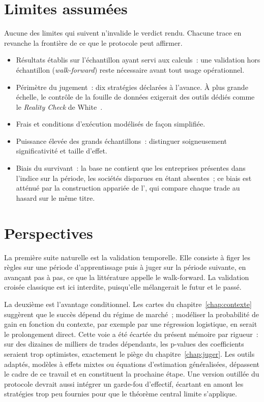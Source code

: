 \section{Limites assumées}
\label{sec:limites}

Aucune des limites qui suivent n'invalide le verdict rendu. Chacune
trace en revanche la frontière de ce que le protocole peut affirmer.

\begin{limites}
\begin{itemize}
  \item Résultats établis sur l'échantillon ayant servi aux calculs~:
        une validation hors échantillon (\emph{walk-forward}) reste
        nécessaire avant tout usage opérationnel.
  \item Périmètre du jugement~: dix stratégies déclarées à l'avance. À
        plus grande échelle, le contrôle de la fouille de données
        exigerait des outils dédiés comme le \emph{Reality Check} de
        White~\cite{white2000}.
  \item Frais et conditions d'exécution modélisés de façon simplifiée.
  \item Puissance élevée des grands échantillons~: distinguer
        soigneusement significativité et taille d'effet.
  \item Biais du survivant~: la base ne contient que les entreprises
        présentes dans l'indice sur la période, les sociétés disparues
        en étant absentes~; ce biais est atténué par la construction
        appariée de l'\edgevar{}, qui compare chaque trade au hasard sur
        le même titre.
\end{itemize}
\end{limites}

\section{Perspectives}
\label{sec:perspectives}

La première suite naturelle est la validation temporelle. Elle consiste
à figer les règles sur une période d'apprentissage puis à juger sur la
période suivante, en avançant pas à pas, ce que la littérature appelle
le walk-forward. La validation croisée classique est ici interdite,
puisqu'elle mélangerait le futur et le passé.

La deuxième est l'avantage conditionnel. Les cartes du
chapitre~\ref{chap:contexte} suggèrent que le succès dépend du régime de
marché~; modéliser la probabilité de gain en fonction du contexte, par
exemple par une régression logistique, en serait le prolongement direct.
Cette voie a été écartée du présent mémoire par rigueur~: sur des
dizaines de milliers de trades dépendants, les p-values des coefficients
seraient trop optimistes, exactement le piège du
chapitre~\ref{chap:juger}. Les outils adaptés, modèles à effets mixtes
ou équations d'estimation généralisées, dépassent le cadre de ce travail
et en constituent la prochaine étape. Une version outillée du protocole
devrait aussi intégrer un garde-fou d'effectif, écartant en amont les
stratégies trop peu fournies pour que le théorème central limite
s'applique.

